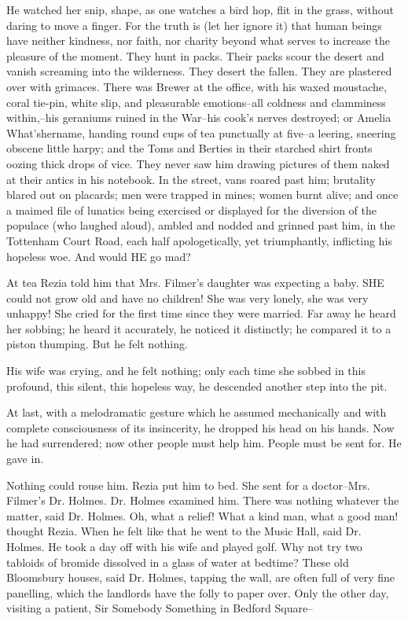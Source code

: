 \documentclass[lang=cn,10pt]{elegantbook}
\begin{document}
He watched her snip, shape, as one watches a bird hop, flit in the
grass, without daring to move a finger.  For the truth is (let her
ignore it) that human beings have neither kindness, nor faith, nor
charity beyond what serves to increase the pleasure of the moment.
They hunt in packs.  Their packs scour the desert and vanish
screaming into the wilderness.  They desert the fallen.  They are
plastered over with grimaces.  There was Brewer at the office, with
his waxed moustache, coral tie-pin, white slip, and pleasurable
emotions--all coldness and clamminess within,--his geraniums ruined
in the War--his cook's nerves destroyed; or Amelia What'shername,
handing round cups of tea punctually at five--a leering, sneering
obscene little harpy; and the Toms and Berties in their starched
shirt fronts oozing thick drops of vice.  They never saw him
drawing pictures of them naked at their antics in his notebook.  In
the street, vans roared past him; brutality blared out on placards;
men were trapped in mines; women burnt alive; and once a maimed
file of lunatics being exercised or displayed for the diversion of
the populace (who laughed aloud), ambled and nodded and grinned
past him, in the Tottenham Court Road, each half apologetically,
yet triumphantly, inflicting his hopeless woe.  And would HE go
mad?

At tea Rezia told him that Mrs. Filmer's daughter was expecting a
baby.  SHE could not grow old and have no children!  She was very
lonely, she was very unhappy!  She cried for the first time since
they were married.  Far away he heard her sobbing; he heard it
accurately, he noticed it distinctly; he compared it to a piston
thumping.  But he felt nothing.

His wife was crying, and he felt nothing; only each time she sobbed
in this profound, this silent, this hopeless way, he descended
another step into the pit.

At last, with a melodramatic gesture which he assumed mechanically
and with complete consciousness of its insincerity, he dropped his
head on his hands.  Now he had surrendered; now other people must
help him.  People must be sent for.  He gave in.

Nothing could rouse him.  Rezia put him to bed.  She sent for a
doctor--Mrs. Filmer's Dr. Holmes.  Dr. Holmes examined him.  There
was nothing whatever the matter, said Dr. Holmes.  Oh, what a
relief!  What a kind man, what a good man! thought Rezia.  When he
felt like that he went to the Music Hall, said Dr. Holmes.  He took
a day off with his wife and played golf.  Why not try two tabloids
of bromide dissolved in a glass of water at bedtime?  These old
Bloomsbury houses, said Dr. Holmes, tapping the wall, are often
full of very fine panelling, which the landlords have the folly to
paper over.  Only the other day, visiting a patient, Sir Somebody
Something in Bedford Square--
\end{document}
